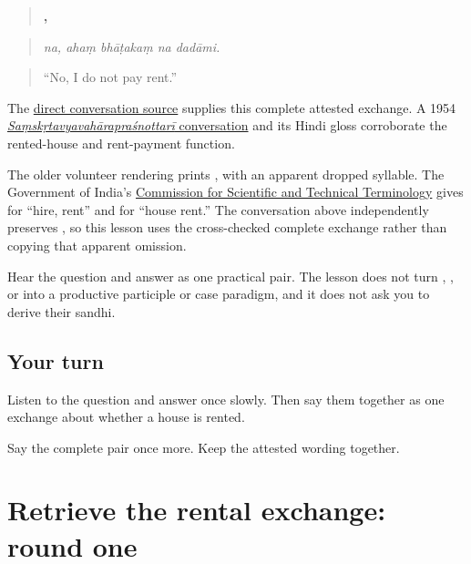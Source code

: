 \begin{quote}
\textbf{,    }
\end{quote}

\begin{quote}
\emph{na, ahaṃ bhāṭakaṃ na dadāmi.}
\end{quote}

\begin{quote}
“No, I do not pay rent.”
\end{quote}

The \href{https://sanskritkalp.com/samskrit-vaartaalaap/kim}{direct conversation source} supplies this complete attested exchange. A 1954 \href{https://sanskritdocuments.org/doc\_z\_misc\_major\_works/vyavahAraprashnottarI.html}{\emph{Saṃskṛtavyavahārapraśnottarī} conversation} and its Hindi gloss corroborate the rented-house and rent-payment function.

The older volunteer rendering prints \textbf{}, with an apparent dropped syllable. The Government of India's \href{https://www.cstt.education.gov.in/sites/default/files/fundamintal-administrative-terminology-english-sanskrit.pdf}{Commission for Scientific and Technical Terminology} gives \textbf{} for “hire, rent” and \textbf{} for “house rent.” The conversation above independently preserves \textbf{}, so this lesson uses the cross-checked complete exchange rather than copying that apparent omission.

\begin{grammarlens}[title={Grammar Lens: keep the exchange bounded}]
Hear the question and answer as one practical pair. The lesson does not turn \textbf{}, \textbf{}, or \textbf{} into a productive participle or case paradigm, and it does not ask you to derive their sandhi.
\end{grammarlens}

\subsection*{Your turn}
Listen to the question and answer once slowly. Then say them together as one exchange about whether a house is rented.

\begin{tcolorbox}[breakable,colback=teal!4,colframe=teal!35!black,title={Before you move on}]
Say the complete pair once more. Keep the attested wording together.
\end{tcolorbox}
\section[(independent rental-exchange …]{Retrieve the rental exchange: round one}

